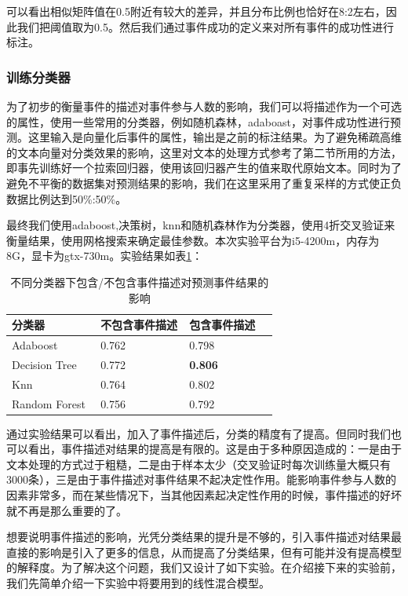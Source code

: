 \documentclass[12pt]{template}
\begin{document}
可以看出相似矩阵值在0.5附近有较大的差异，并且分布比例也恰好在8:2左右，因此我们把阈值取为0.5。然后我们通过事件成功的定义来对所有事件的成功性进行标注。

\subsubsection{训练分类器}
为了初步的衡量事件的描述对事件参与人数的影响，我们可以将描述作为一个可选的属性，使用一些常用的分类器，例如随机森林，adaboast，对事件成功性进行预测。这里输入是向量化后事件的属性，输出是之前的标注结果。为了避免稀疏高维的文本向量对分类效果的影响，这里对文本的处理方式参考了第二节所用的方法，即事先训练好一个拉索回归器，使用该回归器产生的值来取代原始文本。同时为了避免不平衡的数据集对预测结果的影响，我们在这里采用了重复采样的方式使正负数据比例达到50\%:50\%。

最终我们使用adaboost,决策树，knn和随机森林作为分类器，使用4折交叉验证来衡量结果，使用网格搜索来确定最佳参数。本次实验平台为i5-4200m，内存为8G，显卡为gtx-730m。实验结果如表\ref{t1-3}：

\begin{table}[htb] 
  \centering
  \caption{\label{t1-3}不同分类器下包含/不包含事件描述对预测事件结果的影响}
  \begin{tabular*}{\linewidth}{p{0.33\linewidth}p{0.33\linewidth}p{0.33\linewidth}}
\toprule 
分类器&不包含事件描述&包含事件描述\\
\midrule
Adaboost & 0.762 & 0.798 \\
Decision Tree& 0.772 & \textbf{0.806} \\
Knn & 0.764 & 0.802  \\
Random Forest & 0.756 & 0.792 \\
\bottomrule
  \end{tabular*}
\end{table}

通过实验结果可以看出，加入了事件描述后，分类的精度有了提高。但同时我们也可以看出，事件描述对结果的提高是有限的。这是由于多种原因造成的：一是由于文本处理的方式过于粗糙，二是由于样本太少（交叉验证时每次训练量大概只有3000条），三是由于事件描述对事件结果不起决定性作用。能影响事件参与人数的因素非常多，而在某些情况下，当其他因素起决定性作用的时候，事件描述的好坏就不再是那么重要的了。

想要说明事件描述的影响，光凭分类结果的提升是不够的，引入事件描述对结果最直接的影响是引入了更多的信息，从而提高了分类结果，但有可能并没有提高模型的解释度。为了解决这个问题，我们又设计了如下实验。在介绍接下来的实验前，我们先简单介绍一下实验中将要用到的线性混合模型。
\end{document}
